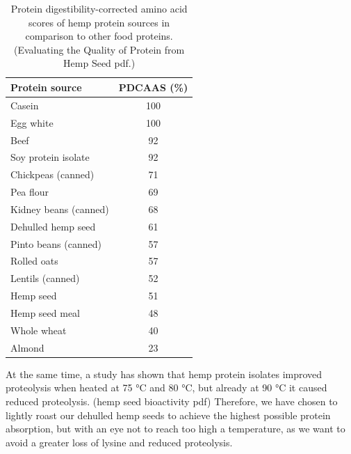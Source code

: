 \begin{table}[h]
    \centering
    \caption{Protein digestibility-corrected amino acid scores of hemp protein sources in comparison to other food proteins. (Evaluating the Quality of Protein from Hemp Seed pdf.)}
    \label{tab:process_table_01}
    \begin{tabular}{l c}
    \hline
    \textbf{Protein source} & \textbf{PDCAAS (\%)} \\
    \hline
    Casein               & 100 \\
    Egg white            & 100 \\
    Beef                 & 92  \\
    Soy protein isolate  & 92  \\
    Chickpeas (canned)   & 71  \\
    Pea flour            & 69  \\
    Kidney beans (canned)& 68  \\
    Dehulled hemp seed   & 61  \\
    Pinto beans (canned) & 57  \\
    Rolled oats          & 57  \\
    Lentils (canned)     & 52  \\
    Hemp seed            & 51  \\
    Hemp seed meal       & 48  \\
    Whole wheat          & 40  \\
    Almond               & 23  \\
    \hline
    \end{tabular}
\end{table}

\vspace{1em}
At the same time, a study has shown that hemp protein isolates improved proteolysis when heated at 75 °C and 80 °C, but already at 90 °C it caused reduced proteolysis. (hemp seed bioactivity pdf) Therefore, we have chosen to lightly roast our dehulled hemp seeds to achieve the highest possible protein absorption, but with an eye not to reach too high a temperature, as we want to avoid a greater loss of lysine and reduced proteolysis.